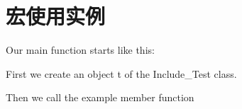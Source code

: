 \chapter{宏使用实例}
\hypertarget{_xE5_xAE_x8F_xE4_xBD_xBF_xE7_x94_xA8_xE5_xAE_x9E_xE4_xBE_x8B}{}\label{_xE5_xAE_x8F_xE4_xBD_xBF_xE7_x94_xA8_xE5_xAE_x9E_xE4_xBE_x8B}
 Our main function starts like this\+: 
\begin{DoxyCodeInclude}{0}

\end{DoxyCodeInclude}
First we create an object {\ttfamily t} of the Include\+\_\+\+Test class. 
\begin{DoxyCodeInclude}{0}

\end{DoxyCodeInclude}
Then we call the example member function 
\begin{DoxyCodeInclude}{0}

\end{DoxyCodeInclude}
